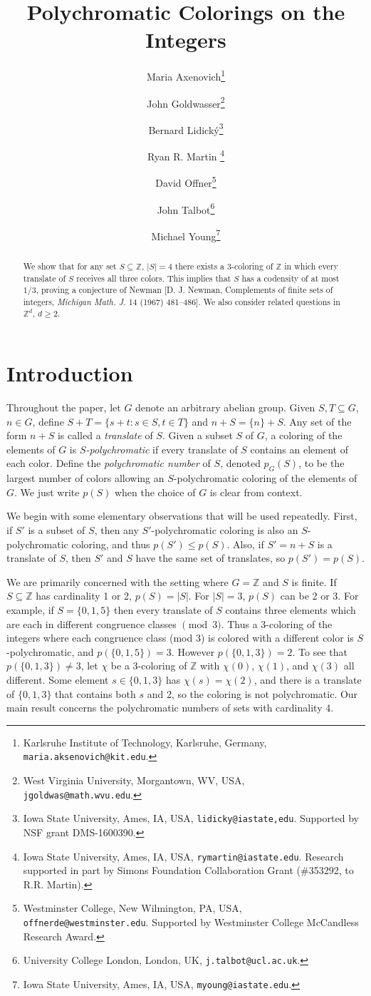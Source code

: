 \documentclass[12pt]{article}
\title{Polychromatic Colorings on the Integers}
\author{
 Maria Axenovich\thanks{Karlsruhe Institute of Technology, Karlsruhe, Germany, \texttt{maria.aksenovich@kit.edu}.} 
 \and John Goldwasser\thanks{ West Virginia University, Morgantown, WV, USA, \texttt{jgoldwas@math.wvu.edu}.}
 \and Bernard Lidick\'y\thanks{Iowa State University, Ames, IA, USA, \texttt{lidicky@iastate,edu}. Supported by NSF grant DMS-1600390.}
 \and Ryan R. Martin \thanks{Iowa State University, Ames, IA, USA, \texttt{rymartin@iastate.edu}. Research supported in part by Simons Foundation Collaboration Grant (\#353292, to R.R. Martin).}
 \and David Offner\thanks{Westminster College, New Wilmington, PA, USA, \texttt{offnerde@westminster.edu}. Supported by Westminster College McCandless Research Award.}
 \and John Talbot\thanks{University College London, London, UK, \texttt{j.talbot@ucl.ac.uk}.}
 \and Michael Young\thanks{Iowa State University, Ames, IA, USA, \texttt{myoung@iastate.edu}.}
 }
\newcommand{\Z}{\ensuremath{\mathbb Z}}
\begin{document}
\maketitle


\begin{abstract}
We show that for any set $S\subseteq \mathbb{Z}$, $|S|=4$ there exists a 3-coloring of $\mathbb{Z}$ in which every translate of $S$ receives all three colors. This implies that $S$ has a codensity of at most $1/3$, proving a conjecture of Newman [D. J. Newman,  Complements of finite sets of integers, \textit{Michigan Math. J.} 14 (1967) 481--486]. %
We also consider related questions in $\mathbb{Z}^d$, $d\geq 2$.
\end{abstract}

\section{Introduction}
Throughout the paper, let $G$ denote an arbitrary abelian group.  Given $S,T \subseteq G$, $n \in G$, define $S+T = \{s+t: s\in S, t\in T\}$ and $n+S  = \{n\} + S$. Any set of the form $n+S$ is called a \textit{translate} of $S$. Given a subset $S$ of $G$, a coloring of the elements of $G$ is \textit{$S$-polychromatic} if every translate of $S$ contains an element of each color.  Define the \textit{polychromatic number} of $S$, denoted $p_G(S)$, to be the largest number of colors allowing an $S$-polychromatic coloring of the elements of $G$.  We just write $p(S)$ when the choice of $G$ is clear from context. 

We begin with some elementary observations that will be used repeatedly.  First, if $S'$ is a subset of $S$, then any $S'$-polychromatic coloring is also an $S$-polychromatic coloring, and thus $p(S') \le p(S)$. Also, if $S'=n+S$ is a translate of $S$, then $S'$ and $S$ have the same set of translates, so $p(S') = p(S)$.

We are primarily concerned with the setting where $G= \Z$ and $S$ is finite. If $S \subseteq \Z$ has cardinality 1 or 2, $p(S)=|S|$. For $|S|=3$, $p(S)$ can be 2 or 3.  For example, if $S=\{0,1,5\}$ then every translate of $S$ contains three elements which are each in different congruence classes $\pmod{3}$.  Thus a 3-coloring of the integers where each congruence class (mod 3) is colored with a different color is $S$-polychromatic, and $p(\{0,1,5\})=3$. However $p(\{0,1,3\})=2$.  To see that $p(\{0,1,3\}) \neq 3$, let $\chi$ be a 3-coloring of $\Z$ with $\chi(0)$, $\chi(1)$, and $\chi(3)$ all different. Some element $s \in \{0,1,3\}$ has $\chi(s) = \chi(2)$, and there is a translate of $\{0,1,3\}$ that contains both $s$ and 2, so the coloring is not polychromatic.  Our main result concerns the polychromatic numbers of sets with cardinality 4.
\end{document}
